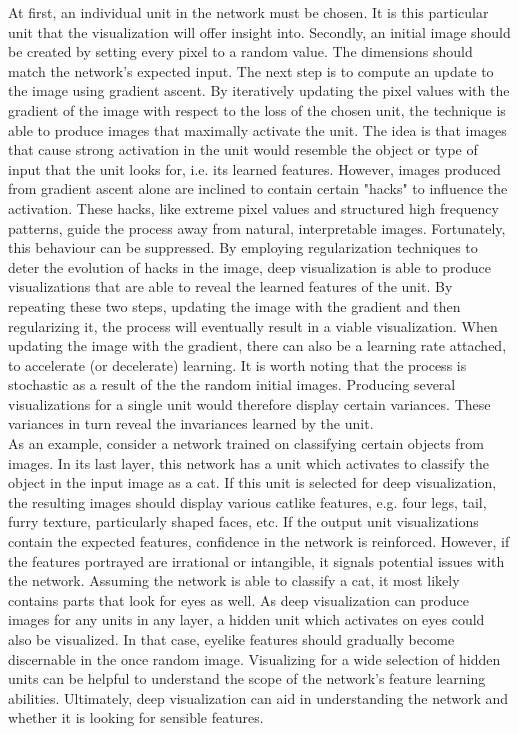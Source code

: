 \noindent At first, an individual unit in the network must be chosen. It is this particular unit that the visualization will offer insight into. Secondly, an initial image should be created by setting every pixel to a random value. The dimensions should match the network's expected input. The next step is to compute an update to the image using gradient ascent. By iteratively updating the pixel values with the gradient of the image with respect to the loss of the chosen unit, the technique is able to produce images that maximally activate the unit. The idea is that images that cause strong activation in the unit would resemble the object or type of input that the unit looks for, i.e. its learned features. However, images produced from gradient ascent alone are inclined to contain certain "hacks" to influence the activation. These hacks, like extreme pixel values and structured high frequency patterns, guide the process away from natural, interpretable images. Fortunately, this behaviour can be suppressed. By employing regularization techniques to deter the evolution of hacks in the image, deep visualization is able to produce visualizations that are able to reveal the learned features of the unit. By repeating these two steps, updating the image with the gradient and then regularizing it, the process will eventually result in a viable visualization. When updating the image with the gradient, there can also be a learning rate attached, to accelerate (or decelerate) learning. It is worth noting that the process is stochastic as a result of the the random initial images. Producing several visualizations for a single unit would therefore display certain variances. These variances in turn reveal the invariances learned by the unit. \\

\noindent As an example, consider a network trained on classifying certain objects from images. In its last layer, this network has a unit which activates to classify the object in the input image as a cat. If this unit is selected for deep visualization, the resulting images should display various catlike features, e.g. four legs, tail, furry texture, particularly shaped faces, etc. If the output unit visualizations contain the expected features, confidence in the network is reinforced. However, if the features portrayed are irrational or intangible, it signals potential issues with the network. Assuming the network is able to classify a cat, it most likely contains parts that look for eyes as well. As deep visualization can produce images for any units in any layer, a hidden unit which activates on eyes could also be visualized. In that case, eyelike features should gradually become discernable in the once random image. Visualizing for a wide selection of hidden units can be helpful to understand the scope of the network's feature learning abilities. Ultimately, deep visualization can aid in understanding the network and whether it is looking for sensible features. \\

